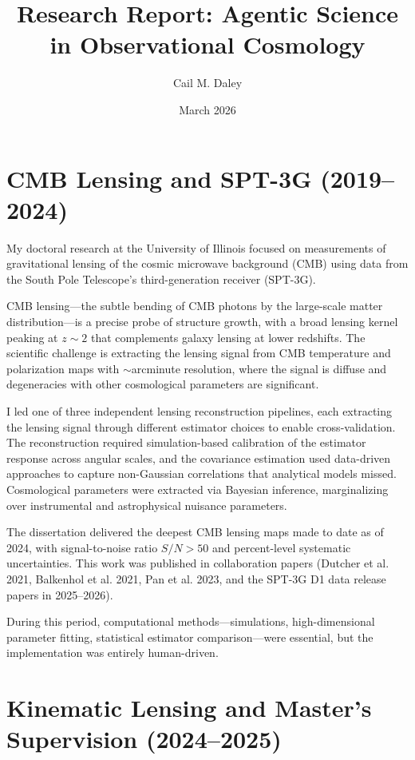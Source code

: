 \documentclass[11pt,a4paper]{article}
\title{Research Report: Agentic Science in Observational Cosmology}
\author{Cail M. Daley}
\date{March 2026}
\begin{document}
\maketitle

\section*{CMB Lensing and SPT-3G (2019--2024)}

My doctoral research at the University of Illinois focused on measurements of gravitational lensing of the cosmic microwave background (CMB) using data from the South Pole Telescope's third-generation receiver (SPT-3G).

CMB lensing---the subtle bending of CMB photons by the large-scale matter distribution---is a precise probe of structure growth, with a broad lensing kernel peaking at $z \sim 2$ that complements galaxy lensing at lower redshifts. The scientific challenge is extracting the lensing signal from CMB temperature and polarization maps with $\sim$arcminute resolution, where the signal is diffuse and degeneracies with other cosmological parameters are significant.

I led one of three independent lensing reconstruction pipelines, each extracting the lensing signal through different estimator choices to enable cross-validation. The reconstruction required simulation-based calibration of the estimator response across angular scales, and the covariance estimation used data-driven approaches to capture non-Gaussian correlations that analytical models missed. Cosmological parameters were extracted via Bayesian inference, marginalizing over instrumental and astrophysical nuisance parameters.

The dissertation delivered the deepest CMB lensing maps made to date as of 2024, with signal-to-noise ratio $S/N > 50$ and percent-level systematic uncertainties. This work was published in collaboration papers (Dutcher et al. 2021, Balkenhol et al. 2021, Pan et al. 2023, and the SPT-3G D1 data release papers in 2025--2026).

During this period, computational methods---simulations, high-dimensional parameter fitting, statistical estimator comparison---were essential, but the implementation was entirely human-driven.

\section*{Kinematic Lensing and Master's Supervision (2024--2025)}
\end{document}

